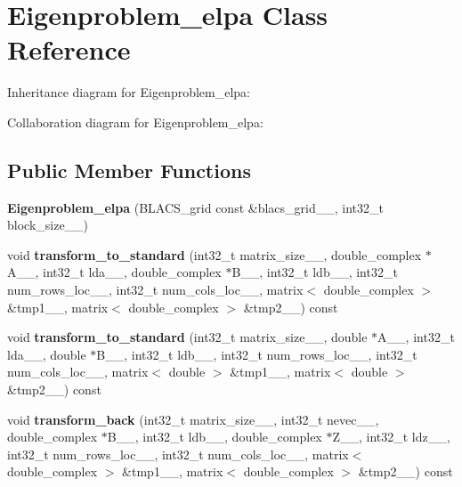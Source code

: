 \hypertarget{class_eigenproblem__elpa}{}\section{Eigenproblem\+\_\+elpa Class Reference}
\label{class_eigenproblem__elpa}


Inheritance diagram for Eigenproblem\+\_\+elpa\+:


Collaboration diagram for Eigenproblem\+\_\+elpa\+:
\subsection*{Public Member Functions}
\begin{DoxyCompactItemize}
\item 
\hypertarget{class_eigenproblem__elpa_a6f26ff6d3fe68e9957bb1bbc9427e52f}{}{\bfseries Eigenproblem\+\_\+elpa} (B\+L\+A\+C\+S\+\_\+grid const \&blacs\+\_\+grid\+\_\+\+\_\+, int32\+\_\+t block\+\_\+size\+\_\+\+\_\+)\label{class_eigenproblem__elpa_a6f26ff6d3fe68e9957bb1bbc9427e52f}

\item 
\hypertarget{class_eigenproblem__elpa_aaff441e9b6519df17b798a6a4d468ae2}{}void {\bfseries transform\+\_\+to\+\_\+standard} (int32\+\_\+t matrix\+\_\+size\+\_\+\+\_\+, double\+\_\+complex $\ast$A\+\_\+\+\_\+, int32\+\_\+t lda\+\_\+\+\_\+, double\+\_\+complex $\ast$B\+\_\+\+\_\+, int32\+\_\+t ldb\+\_\+\+\_\+, int32\+\_\+t num\+\_\+rows\+\_\+loc\+\_\+\+\_\+, int32\+\_\+t num\+\_\+cols\+\_\+loc\+\_\+\+\_\+, matrix$<$ double\+\_\+complex $>$ \&tmp1\+\_\+\+\_\+, matrix$<$ double\+\_\+complex $>$ \&tmp2\+\_\+\+\_\+) const \label{class_eigenproblem__elpa_aaff441e9b6519df17b798a6a4d468ae2}

\item 
\hypertarget{class_eigenproblem__elpa_a132bdc117d3e065f384e39f55f49e647}{}void {\bfseries transform\+\_\+to\+\_\+standard} (int32\+\_\+t matrix\+\_\+size\+\_\+\+\_\+, double $\ast$A\+\_\+\+\_\+, int32\+\_\+t lda\+\_\+\+\_\+, double $\ast$B\+\_\+\+\_\+, int32\+\_\+t ldb\+\_\+\+\_\+, int32\+\_\+t num\+\_\+rows\+\_\+loc\+\_\+\+\_\+, int32\+\_\+t num\+\_\+cols\+\_\+loc\+\_\+\+\_\+, matrix$<$ double $>$ \&tmp1\+\_\+\+\_\+, matrix$<$ double $>$ \&tmp2\+\_\+\+\_\+) const \label{class_eigenproblem__elpa_a132bdc117d3e065f384e39f55f49e647}

\item 
\hypertarget{class_eigenproblem__elpa_af6122b93290b7c234b6ee17e21f255f5}{}void {\bfseries transform\+\_\+back} (int32\+\_\+t matrix\+\_\+size\+\_\+\+\_\+, int32\+\_\+t nevec\+\_\+\+\_\+, double\+\_\+complex $\ast$B\+\_\+\+\_\+, int32\+\_\+t ldb\+\_\+\+\_\+, double\+\_\+complex $\ast$Z\+\_\+\+\_\+, int32\+\_\+t ldz\+\_\+\+\_\+, int32\+\_\+t num\+\_\+rows\+\_\+loc\+\_\+\+\_\+, int32\+\_\+t num\+\_\+cols\+\_\+loc\+\_\+\+\_\+, matrix$<$ double\+\_\+complex $>$ \&tmp1\+\_\+\+\_\+, matrix$<$ double\+\_\+complex $>$ \&tmp2\+\_\+\+\_\+) const \label{class_eigenproblem__elpa_af6122b93290b7c234b6ee17e21f255f5}


\end{DoxyCompactItemize}
